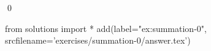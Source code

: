 
\begin{ex} 
  \label{ex:summation-0}
  
  \qed
\end{ex} 
\begin{python0}
from solutions import *
add(label="ex:summation-0",
    srcfilename='exercises/summation-0/answer.tex') 
\end{python0}

